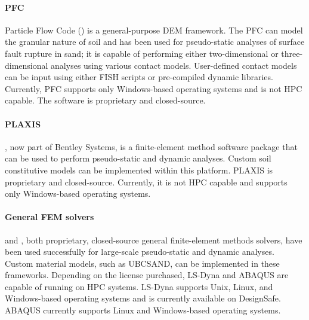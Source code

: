 \paragraph{PFC}
Particle Flow Code () is a general-purpose DEM framework. The PFC can model the granular nature of soil and has been used for pseudo-static analyses of surface fault rupture in sand; it is capable of performing either two-dimensional or three-dimensional analyses using various contact models. User-defined contact models can be input using either FISH scripts or pre-compiled dynamic libraries. Currently, PFC supports only Windows-based operating systems and is not HPC capable. The software is proprietary and closed-source.

\paragraph{PLAXIS}
, now part of Bentley Systems, is a finite-element method software package that can be used to perform pseudo-static and dynamic analyses. Custom soil constitutive models can be implemented within this platform. PLAXIS is proprietary and closed-source. Currently, it is not HPC capable and supports only Windows-based operating systems.

\paragraph{General FEM solvers}
 and , both proprietary, closed-source general finite-element methods solvers, have been used successfully for large-scale pseudo-static and dynamic analyses. Custom material models, such as UBCSAND, can be implemented in these frameworks. Depending on the license purchased, LS-Dyna and ABAQUS are capable of running on HPC systems. LS-Dyna supports Unix, Linux, and Windows-based operating systems and is currently available on DesignSafe. ABAQUS currently supports Linux and Windows-based operating systems.



